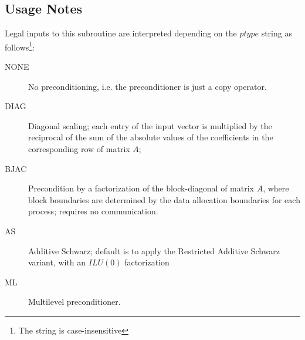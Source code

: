 \subsection*{Usage Notes}
Legal inputs to this subroutine are interpreted depending on the
$ptype$ string as follows\footnote{The string is case-insensitive}:
\begin{description}
\item[NONE] No preconditioning, i.e. the preconditioner is just a copy
  operator.
\item[DIAG] Diagonal scaling; each entry of the input vector is
  multiplied by the reciprocal of the sum of the absolute values of
  the coefficients in the corresponding row of matrix  $A$;
\item[BJAC] Precondition by a  factorization of the
  block-diagonal of matrix $A$, where block boundaries are determined
  by the data allocation boundaries for each process; requires no
  communication. 
\item[AS] Additive Schwarz; default is to apply the Restricted
  Additive Schwarz variant, with an $ILU(0)$ factorization
\item[ML] Multilevel preconditioner.
\end{description}







